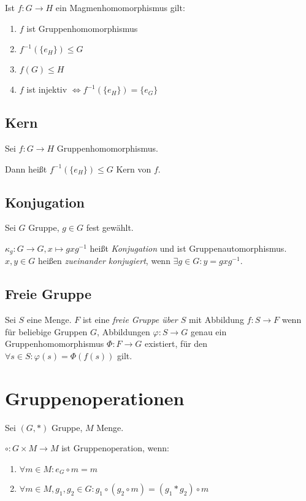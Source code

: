 Ist $f : G \rightarrow H$ ein Magmenhomomorphismus gilt:

\begin{enumerate}[label=(\alph*)]
	\item $f$ ist Gruppenhomomorphismus
	\item $f^{-1}(\{e_H\}) \leq G$
	\item $f(G) \leq H$
	\item $f$ ist injektiv $\iff f^{-1}(\{e_H\}) = \{e_G\}$
\end{enumerate}

\subsection*{Kern}

Sei $f : G \rightarrow H$ Gruppenhomomorphismus.

Dann heißt $f^{-1}(\{e_H\}) \leq G$ Kern von $f$.

\subsection*{Konjugation}

Sei $G$ Gruppe, $g \in G$ fest gewählt.

$\kappa_g : G \rightarrow G, x \mapsto gxg^{-1}$ heißt \emph{Konjugation} und ist Gruppenautomorphismus. $x, y \in G$ heißen \emph{zueinander konjugiert}, wenn $\exists g \in G : y = gxg^{-1}$.

\subsection*{Freie Gruppe}

Sei $S$ eine Menge. $F$ ist eine \emph{freie Gruppe über $S$} mit Abbildung $f : S \rightarrow F$ wenn für beliebige Gruppen $G$, Abbildungen $\varphi : S \rightarrow G$ genau ein Gruppenhomomorphismus $\Phi : F \rightarrow G$ existiert, für den $\forall s \in S : \varphi(s) = \Phi(f(s))$ gilt.

\section*{Gruppenoperationen}

Sei $(G,*)$ Gruppe, $M$ Menge.

$\circ : G \times M \rightarrow M$ ist Gruppenoperation, wenn:

\begin{enumerate}[label=(\alph*)]
	\item $\forall m \in M : e_G \circ m = m$
	\item $\forall m \in M, g_1, g_2 \in G : g_1 \circ ( g_2 \circ m ) = ( g_1 * g_2 ) \circ m$
\end{enumerate}

